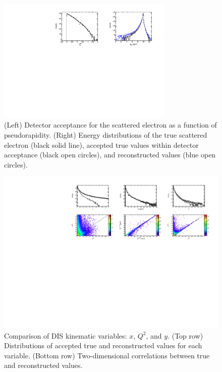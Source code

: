 \documentclass[letterpaper,12pt]{article}
\begin{document}
\begin{figure}[ht]
    \centering
    \includegraphics[width=0.75\textwidth]{Figures/electron.pdf}
    \caption{(Left) Detector acceptance for the scattered electron as a function of pseudorapidity. (Right) Energy distributions of the true scattered electron (black solid line), accepted true values within detector acceptance (black open circles), and reconstructed values (blue open circles).}
\label{fig:electron}
\end{figure}

\begin{figure}[h]
    \centering
    \includegraphics[scale=0.6]{Figures/DIS_kinematics.pdf}
    \caption{Comparison of DIS kinematic variables: $x$, $Q^{2}$, and $y$. (Top row) Distributions of accepted true and reconstructed values for each variable. (Bottom row) Two-dimensional correlations between true and reconstructed values.}
\label{fig:diskinematics}
\end{figure}
\end{document}
